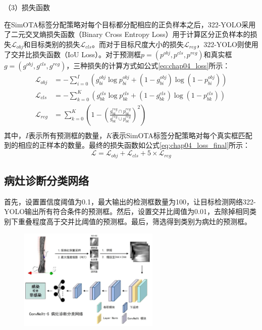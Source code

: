 （3）损失函数

在SimOTA标签分配策略对每个目标都分配相应的正负样本之后，322-YOLO采用了二元交叉熵损失函数（Binary Cross Entropy Loss）用于计算区分正负样本的损失\(\mathcal{L}_{obj}\)和目标类别的损失\(\mathcal{L}_{cls}\)。而对于目标尺度大小的损失\(\mathcal{L}_{reg}\)，322-YOLO则使用了交并比损失函数（IoU Loss）。对于预测框\(p = (p^{obj}, p^{cls}, p^{reg})\)和真实框\(g = (g^{obj}, g^{cls}, g^{reg})\)，三种损失的计算方式如公式\ref{eq:chap04_loss}所示：
\begin{equation}
  \begin{aligned}
    \mathcal{L}_{obj} & = -\sum_{i=0}^I( g^{obj}_{bi} \log p^{obj}_{bi} +  (1- g^{obj}_{bi})\log(1-p^{obj}_{bi} ))      \\
    \mathcal{L}_{cls} & = -\sum_{k=0}^K( g^{cls}_{bk} \log p^{cls}_{bk} +  (1- g^{cls}_{bk})\log(1-p^{cls}_{bk} ))      \\
    \mathcal{L}_{reg} & = \sum_{k=0}^K( 1 - (\frac{g^{reg}_{bk} \cap p^{reg}_{bk}}{g^{reg}_{bk} \cup p^{reg}_{bk}})^2 ) \\
  \end{aligned}
  \label{eq:chap04_loss}
\end{equation}
其中，\(I\)表示所有预测框的数量，\(K\)表示SimOTA标签分配策略对每个真实框匹配到的相应的正样本的数量。最终的损失函数如公式\ref{eq:chap04_loss_final}所示：
\begin{equation}
  \mathcal{L}  = \mathcal{L}_{obj} + \mathcal{L}_{cls} + 5 \times \mathcal{L}_{reg}
  \label{eq:chap04_loss_final}
\end{equation}

\subsection{病灶诊断分类网络}

首先，设置置信度阈值为0.1，最大输出的检测框数量为100，让目标检测网络322-YOLO输出所有符合条件的预测框。然后，设置交并比阈值为0.01，去除掉相同类别下重叠程度高于交并比阈值的预测框。最后，筛选得到类别为病灶的预测框。

\begin{figure}[htbp]
  \centering
  \includegraphics[width=0.6\textwidth]{figures/chap04_classifier.jpg}
  \label{fig:chap04_classifier}
\end{figure}

